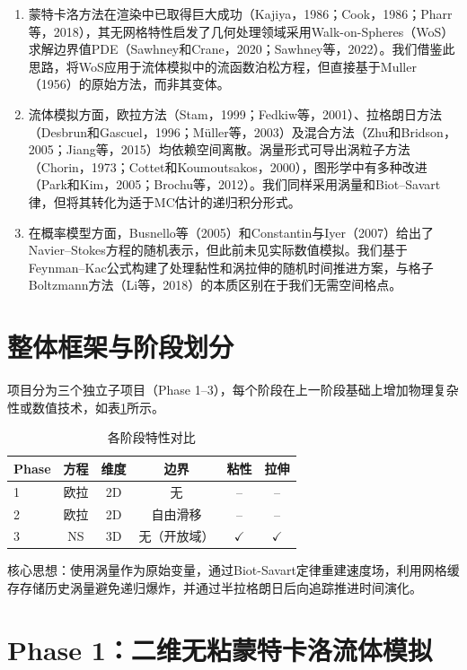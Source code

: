 \documentclass[UTF8,fontset=fandol]{ctexart}
\begin{document}
\begin{enumerate}
    \item 蒙特卡洛方法在渲染中已取得巨大成功（Kajiya，1986；Cook，1986；Pharr等，2018），其无网格特性启发了几何处理领域采用Walk-on-Spheres（WoS）求解边界值PDE（Sawhney和Crane，2020；Sawhney等，2022）。我们借鉴此思路，将WoS应用于流体模拟中的流函数泊松方程，但直接基于Muller（1956）的原始方法，而非其变体。
    \item 流体模拟方面，欧拉方法（Stam，1999；Fedkiw等，2001）、拉格朗日方法（Desbrun和Gascuel，1996；Müller等，2003）及混合方法（Zhu和Bridson，2005；Jiang等，2015）均依赖空间离散。涡量形式可导出涡粒子方法（Chorin，1973；Cottet和Koumoutsakos，2000），图形学中有多种改进（Park和Kim，2005；Brochu等，2012）。我们同样采用涡量和Biot–Savart律，但将其转化为适于MC估计的递归积分形式。
    \item 在概率模型方面，Busnello等（2005）和Constantin与Iyer（2007）给出了Navier–Stokes方程的随机表示，但此前未见实际数值模拟。我们基于Feynman–Kac公式构建了处理黏性和涡拉伸的随机时间推进方案，与格子Boltzmann方法（Li等，2018）的本质区别在于我们无需空间格点。
\end{enumerate}

\section{整体框架与阶段划分}
项目分为三个独立子项目（Phase 1--3），每个阶段在上一阶段基础上增加物理复杂性或数值技术，如表\ref{tab:phases}所示。

\begin{table}[htbp]
\centering
\caption{各阶段特性对比}
\label{tab:phases}
\begin{tabular}{lccccc}
\toprule
Phase & 方程 & 维度 & 边界 & 粘性 & 拉伸 \\
\midrule
1 & 欧拉 & 2D & 无 & -- & -- \\
2 & 欧拉 & 2D & 自由滑移 & -- & --\\
3 & NS & 3D & 无（开放域） & $\checkmark$ & $\checkmark$ \\ 
\bottomrule
\end{tabular}
\end{table}

核心思想：使用涡量作为原始变量，通过Biot-Savart定律重建速度场，利用网格缓存存储历史涡量避免递归爆炸，并通过半拉格朗日后向追踪推进时间演化。

\section{Phase 1：二维无粘蒙特卡洛流体模拟}
\end{document}
